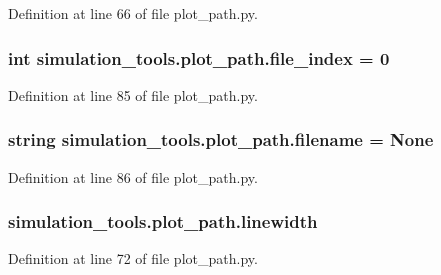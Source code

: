 Definition at line 66 of file plot\+\_\+path.\+py.

\subsubsection[{\texorpdfstring{file\+\_\+index}{file_index}}]{\setlength{\rightskip}{0pt plus 5cm}int simulation\+\_\+tools.\+plot\+\_\+path.\+file\+\_\+index = 0}\hypertarget{namespacesimulation__tools_1_1plot__path_a8c127251b0fd95a5549a7a377bf4599f}{}\label{namespacesimulation__tools_1_1plot__path_a8c127251b0fd95a5549a7a377bf4599f}


Definition at line 85 of file plot\+\_\+path.\+py.

\subsubsection[{\texorpdfstring{filename}{filename}}]{\setlength{\rightskip}{0pt plus 5cm}string simulation\+\_\+tools.\+plot\+\_\+path.\+filename = None}\hypertarget{namespacesimulation__tools_1_1plot__path_a8f5cef920e050b53c59625248c95cb34}{}\label{namespacesimulation__tools_1_1plot__path_a8f5cef920e050b53c59625248c95cb34}


Definition at line 86 of file plot\+\_\+path.\+py.

\subsubsection[{\texorpdfstring{linewidth}{linewidth}}]{\setlength{\rightskip}{0pt plus 5cm}simulation\+\_\+tools.\+plot\+\_\+path.\+linewidth}\hypertarget{namespacesimulation__tools_1_1plot__path_a4cd89bd0371b4c882338ac8076cb684f}{}\label{namespacesimulation__tools_1_1plot__path_a4cd89bd0371b4c882338ac8076cb684f}


Definition at line 72 of file plot\+\_\+path.\+py.

